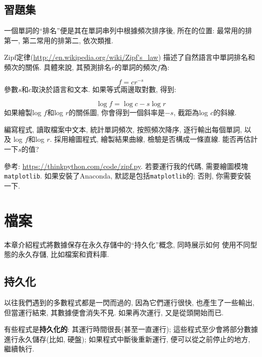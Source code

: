 \documentclass[10pt]{book}
\begin{document}
\section{習題集}

\begin{exercise}

一個單詞的``排名''便是其在單詞串列中根據頻次排序後, 所在的位置:
最常用的排第一, 第二常用的排第二, 依次類推. 

Zipf定律(\url{http://en.wikipedia.org/wiki/Zipf's_law})
描述了自然語言中單詞排名和頻次的關係. 
具體來說, 其預測排名$r$的單詞的頻次$f$為:

\[ f = c r^{-s} \]
%
參數$s$和$c$取決於語言和文本. 
如果等式兩邊取對數, 得到:

\[ \log f = \log c - s \log r \]
%
如果繪製log $f$和log $r$的關係圖, 你會得到一個斜率是$-s$, 截距為log $c$的斜線. 

編寫程式, 讀取檔案中文本, 
統計單詞頻次, 按照頻次降序, 逐行輸出每個單詞, 以及
log $f$和log $r$. 
採用繪圖程式, 繪製結果曲線, 檢驗是否構成一條直線. 
能否再估計一下$s$的值?

參考: \url{https://thinkpython.com/code/zipf.py}.
若要運行我的代碼, 需要繪圖模塊{\tt matplotlib}.
如果安裝了Anaconda, 默認是包括{\tt matplotlib}的;
否則, 你需要安裝一下. 

\end{exercise}



\chapter{檔案}

本章介紹程式將數據保存在永久存儲中的``持久化''概念, 同時展示如何
使用不同型態的永久存儲, 比如檔案和資料庫. 


\section{持久化}

以往我們遇到的多數程式都是一閃而過的, 因為它們運行很快, 也產生了一些輸出, 
但當運行結束, 其數據便會消失不見. 
如果再次運行, 又是從頭開始而已. 

有些程式是{\bf 持久化的}: 其運行時間很長(甚至一直運行);
這些程式至少會將部分數據進行永久儲存(比如, 硬盤);
如果程式中斷後重新運行, 便可以從之前停止的地方, 繼續執行. 
\end{document}
